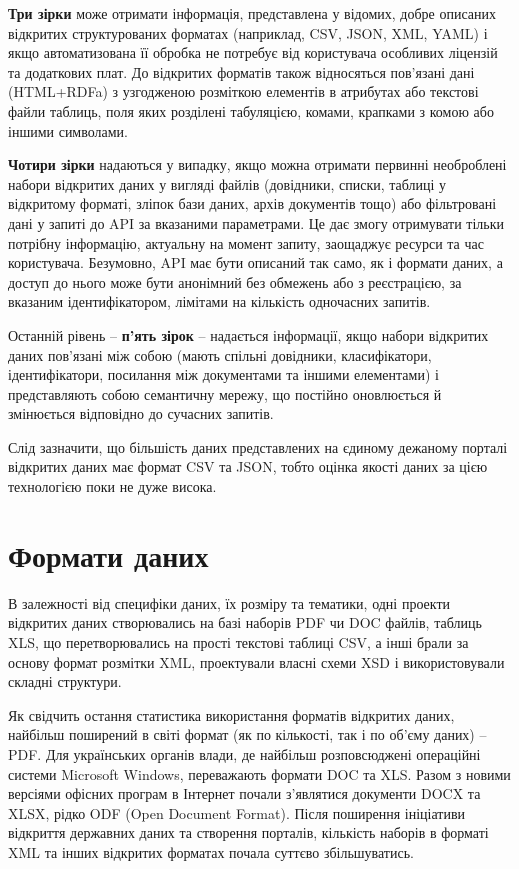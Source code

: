 \textbf{Три зірки} може отримати інформація, представлена у відомих, добре описаних відкритих структурованих форматах
(наприклад, CSV, JSON, XML, YAML) і якщо автоматизована її
обробка не потребує від користувача особливих ліцензій та додаткових плат. До відкритих
форматів також відносяться пов’язані дані (HTML+RDFa) з узгодженою розміткою елементів
в атрибутах або текстові файли таблиць, поля яких
розділені табуляцією, комами, крапками з комою або іншими символами.

\textbf{Чотири зірки} надаються у випадку, якщо можна отримати первинні необроблені набори
відкритих даних у вигляді файлів (довідники, списки, таблиці у відкритому форматі, зліпок
бази даних, архів документів тощо) або фільтровані дані у запиті до API за вказаними
параметрами. Це дає змогу отримувати тільки потрібну інформацію, актуальну на момент
запиту, заощаджує ресурси та час користувача. Безумовно, API має бути описаний так само,
як і формати даних, а доступ до нього може бути анонімний без обмежень або з реєстрацією,
за вказаним ідентифікатором, лімітами на кількість одночасних запитів.

Останній рівень – \textbf{п’ять зірок} – надається інформації, якщо набори відкритих даних
пов’язані між собою (мають спільні довідники, класифікатори, ідентифікатори, посилання
між документами та іншими елементами) і представляють собою семантичну мережу,
що постійно оновлюється й змінюється відповідно до сучасних запитів.

Слід зазначити, що більшість даних представлених на єдиному дежаному порталі відкритих даних
має формат CSV та JSON, тобто оцінка якості даних за цією технологією поки не дуже висока.

\section{Формати даних}

В залежності від специфіки даних, їх розміру та тематики,
одні проекти відкритих даних створювались на базі наборів PDF чи DOC файлів,
таблиць XLS, що перетворювались на прості текстові таблиці CSV, а інші брали за
основу формат розмітки XML, проектували власні схеми XSD і використовували складні
структури.

Як свідчить остання статистика використання форматів відкритих даних,
найбільш поширений в світі формат (як по кількості, так і по об’єму даних) – PDF.
Для українських органів влади, де найбільш розповсюджені операційні системи Microsoft Windows,
переважають формати DOC та XLS. Разом з новими версіями офісних програм в Інтернет почали
з’являтися документи DOCX та XLSX, рідко ODF (Open Document Format).
Після поширення ініціативи відкриття державних даних та
створення порталів, кількість наборів в форматі XML та інших відкритих форматах почала
суттєво збільшуватись.

